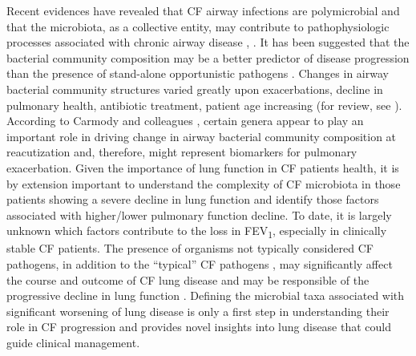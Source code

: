 Recent evidences have revealed that CF airway infections are polymicrobial \cite{stressmann2011analysis} and that the microbiota, as a collective entity, may contribute to pathophysiologic processes associated with chronic airway disease \cite{huang2011emerging}, \cite{rogers2014respiratory}. It has been suggested that the bacterial community composition may be a better predictor of disease progression than the presence of stand-alone opportunistic pathogens \cite{rogers2010determining}.\textcolor[rgb]{0.2,0.2,0.2}{ }Changes in airway bacterial community structures varied greatly upon exacerbations, decline in pulmonary health, antibiotic treatment, patient age increasing (for review, see \cite{lynch2013cystic, zhao2014modeling, mahenthiralingam2014emerging}). According to Carmody and colleagues \cite{carmody2013changes}, certain genera appear to play an important role in driving  change in airway bacterial community composition at reacutization and, therefore, might represent biomarkers for pulmonary exacerbation. Given the importance of lung function in  CF patients health, it is by extension important to understand the complexity of CF microbiota in those patients showing a severe decline in lung function and identify those factors associated with higher/lower pulmonary function decline. To date, it is largely unknown which factors contribute to the loss in FEV\textsubscript{1}, especially in clinically stable CF patients. The presence of organisms not typically considered CF pathogens, in addition to the ``typical'' CF pathogens \cite{hauser2011clinical}, may significantly affect the course and outcome of CF lung disease and may be responsible of the progressive decline in lung function \cite{sibley2009relevance}. Defining the microbial taxa associated with significant worsening of lung disease is only a first step in understanding their role in CF progression and provides novel insights into lung disease that could guide clinical management.\\ 
